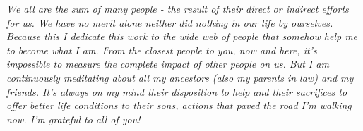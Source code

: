 \begin{dedicatoria}
   \vspace*{\fill}
   \centering
   \noindent
   \textit{We all are the sum of many people - the result of their direct or indirect  efforts for us. We have no merit alone neither did nothing in our life by ourselves. Because this I dedicate this work to the wide web of people that somehow help me to become what I am. From the closest people to you, now and here, it's impossible to measure the complete impact of other people on us. But I am continuously meditating about all my ancestors (also my parents in law) and my friends. It's always on my mind their disposition to help and their sacrifices to offer better life conditions to their sons, actions that paved the road I'm walking now. I'm grateful to all of you!} 
   \vspace*{\fill}
\end{dedicatoria}